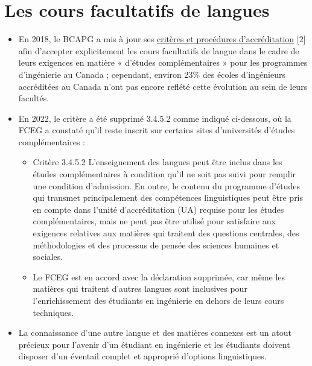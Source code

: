 \section{Les cours facultatifs de langues}\label{les-cours-facultatifs-de-langues}



\begin{itemize}
 \item En 2018, le BCAPG a mis à jour ses \href{https://engineerscanada.ca/sites/default/files/accreditation/2021-2022-cycle/accreditation-criteria-procedures-2020.pdf}{critères et procédures d'accréditation} [2] afin d'accepter explicitement les cours facultatifs de langue dans le cadre de leurs exigences en matière « d'études complémentaires » pour les programmes d'ingénierie au Canada ; cependant, environ 23\% des écoles d'ingénieurs accréditées au Canada n'ont pas encore reflété cette évolution au sein de leurs facultés.
 \item En 2022, le critère a été supprimé 3.4.5.2 comme indiqué ci-dessous, où la FCEG a constaté qu'il reste inscrit sur certains sites d'universités d'études complémentaires :
 \begin{itemize}
  \item [Supprimé] Critère 3.4.5.2 L'enseignement des langues peut être inclus dans les études complémentaires à condition qu'il ne soit pas suivi pour remplir une condition d'admission. En outre, le contenu du programme d'études qui transmet principalement des compétences linguistiques peut être pris en compte dans l'unité d'accréditation (UA) requise pour les études complémentaires, mais ne peut pas être utilisé pour satisfaire aux exigences relatives aux matières qui traitent des questions centrales, des méthodologies et des processus de pensée des sciences humaines et sociales.
  \item Le FCEG est en accord avec la déclaration supprimée, car même les matières qui traitent d'autres langues sont inclusives pour l'enrichissement des étudiants en ingénierie en dehors de leurs cours techniques.
 \end{itemize}
 \item La connaissance d'une autre langue et des matières connexes est un atout précieux pour l'avenir d'un étudiant en ingénierie et les étudiants doivent disposer d'un éventail complet et approprié d'options linguistiques.
\end{itemize}


